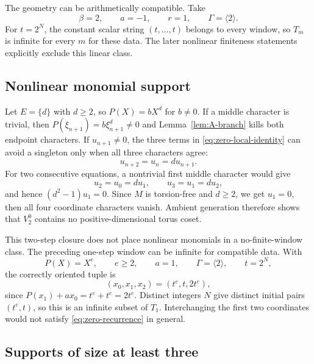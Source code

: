 \documentclass[11pt]{article}
\theoremstyle{definition}
\theoremstyle{remark}
\newcommand{\Gam}{\Gamma}
\begin{document}
The geometry can be arithmetically compatible.  Take
\begin{equation}
\beta=2,\qquad a=-1,\qquad r=1,\qquad
\Gam=\langle2\rangle.
\label{eq:linear-compatible}
\end{equation}
For $t=2^N$, the constant scalar string $(t,\ldots,t)$ belongs to every window, so $T_m$ is infinite for every $m$ for these data.  The later nonlinear finiteness statements explicitly exclude this linear class.

\subsection{Nonlinear monomial support}

Let $E=\{d\}$ with $d\geq2$, so $P(X)=bX^d$ for $b\neq0$.  If a middle character is trivial, then $P(\xi_{n+1})=b\xi_{n+1}^d\neq0$ and Lemma~\ref{lem:A-branch} kills both endpoint characters.  If $u_{n+1}\neq0$, the three terms in \eqref{eq:zero-local-identity} can avoid a singleton only when all three characters agree:
\begin{equation}
u_{n+2}=u_n=d u_{n+1}.
\label{eq:monomial-local}
\end{equation}
For two consecutive equations, a nontrivial first middle character would give
\[
u_2=u_0=d u_1,
\qquad u_3=u_1=d u_2,
\]
and hence $(d^2-1)u_1=0$.  Since $M$ is torsion-free and $d\geq2$, we get $u_1=0$, then all four coordinate characters vanish.  Ambient generation therefore shows that $V_2^0$ contains no positive-dimensional torus coset.

This two-step closure does not place nonlinear monomials in a no-finite-window class.  The preceding one-step window can be infinite for compatible data.  With
\begin{equation}
P(X)=X^e,\qquad e\geq2,\qquad a=1,\qquad
\Gam=\langle2\rangle,\qquad t=2^N,
\label{eq:monomial-data}
\end{equation}
the correctly oriented tuple is
\begin{equation}
(x_0,x_1,x_2)=(t^e,t,2t^e),
\label{eq:monomial-tuple}
\end{equation}
since $P(x_1)+ax_0=t^e+t^e=2t^e$.  Distinct integers $N$ give distinct
initial pairs $(t^e,t)$, so this is an infinite subset of $T_1$.
Interchanging the first two coordinates would not satisfy
\eqref{eq:zero-recurrence} in general.

\subsection{Supports of size at least three}
\end{document}
